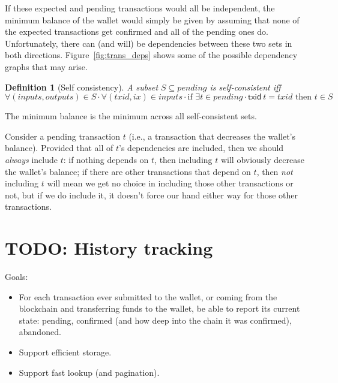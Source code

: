 \documentclass{article}
\newtheorem{definition}{Definition}
\begin{document}
If these expected and pending transactions would all be independent, the
minimum balance of the wallet would simply be given by assuming that none of
the expected transactions get confirmed and all of the pending ones do.
Unfortunately, there can (and will) be dependencies between these two sets
in both directions. Figure~\ref{fig:trans_deps} shows some of the possible
dependency graphs that may arise.

\begin{definition}[Self consistency]
A subset $S \subseteq \mathit{pending}$ is \emph{self-consistent} iff
%
\begin{equation*}
\forall (\mathit{inputs}, \mathit{outputs}) \in S \cdot
\forall (\mathit{txid}, \mathit{ix}) \in \mathit{inputs} \cdot
\text{if } \exists t \in \mathit{pending} \cdot \mathsf{txid} ~ t = \mathit{txid}
\text{ then } t \in S
\end{equation*}
\end{definition}

The minimum balance is the minimum across all self-consistent sets.


Consider a pending transaction $t$ (i.e., a transaction that decreases
the wallet's balance). Provided that all of $t$'s dependencies are included,
then we should \emph{always} include $t$: if nothing depends on $t$, then
including $t$ will obviously decrease the wallet's balance; if there are
other transactions that depend on $t$, then \emph{not} including $t$ will
mean we get no choice in including those other transactions or not, but
if we do include it, it doesn't force our hand either way for those
other transactions.




\section{TODO: History tracking}

Goals:

\begin{itemize}
\item For each transaction ever submitted to the wallet, or coming from the
blockchain and transferring funds to the wallet, be able to report its current
state: pending, confirmed (and how deep into the chain it was confirmed),
abandoned.
\item Support efficient storage.
\item Support fast lookup (and pagination).
\end{itemize}
\end{document}
